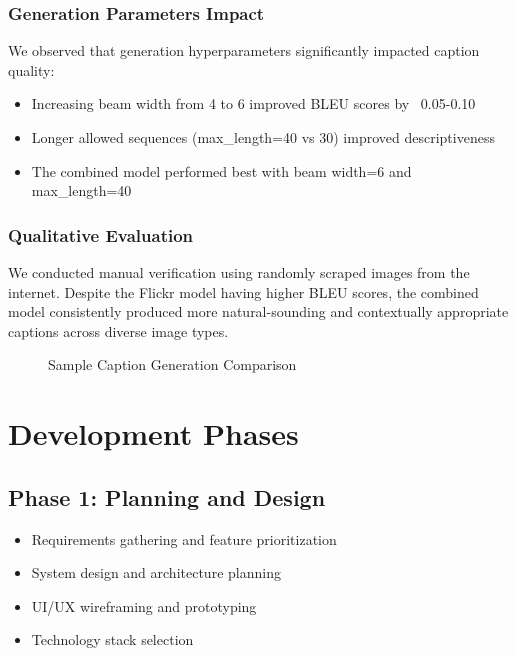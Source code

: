 \documentclass[12pt,a4paper]{report}
\begin{document}
\subsection{Generation Parameters Impact}
We observed that generation hyperparameters significantly impacted caption quality:
\begin{itemize}
    \item Increasing beam width from 4 to 6 improved BLEU scores by ~0.05-0.10
    \item Longer allowed sequences (max\_length=40 vs 30) improved descriptiveness
    \item The combined model performed best with beam width=6 and max\_length=40
\end{itemize}

\subsection{Qualitative Evaluation}
We conducted manual verification using randomly scraped images from the internet. Despite the Flickr model having higher BLEU scores, the combined model consistently produced more natural-sounding and contextually appropriate captions across diverse image types.

\begin{figure}[H]
\centering
{}
\caption{Sample Caption Generation Comparison}
\label{fig:caption_comparison}
\end{figure}

\chapter{Development Phases}
\section{Phase 1: Planning and Design}
\begin{itemize}
    \item Requirements gathering and feature prioritization
    \item System design and architecture planning
    \item UI/UX wireframing and prototyping
    \item Technology stack selection
\end{itemize}
\end{document}
